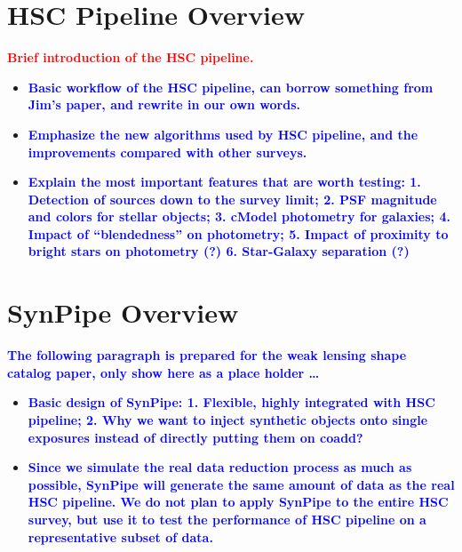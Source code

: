 \documentclass{pasj01}
\newcommand{\plan}[1]{\textcolor{blue} {\textbf{#1}}}
\newcommand{\todo}[1]{\textcolor{red} {\textbf{#1}}}
\begin{document}

\section{HSC Pipeline Overview}

    \todo{Brief introduction of the HSC pipeline.}
    \begin{itemize}
        \item \plan{Basic workflow of the HSC pipeline, 
                    can borrow something from Jim's paper, and rewrite in our own words.}
        \item \plan{Emphasize the new algorithms used by HSC pipeline, and the 
                    improvements compared with other surveys.}
        \item \plan{Explain the most important features that are worth testing:
                    1. Detection of sources down to the survey limit;
                    2. PSF magnitude and colors for stellar objects;
                    3. cModel photometry for galaxies;
                    4. Impact of ``blendedness'' on photometry;
                    5. Impact of proximity to bright stars on photometry (?)
                    6. Star-Galaxy separation (?)}   
    \end{itemize}


\section{SynPipe Overview}

    \plan{The following paragraph is prepared for the weak lensing shape catalog paper, 
          only show here as a place holder \ldots}
          
    \begin{itemize}
        \item \plan{Basic design of SynPipe:
                    1. Flexible, highly integrated with HSC pipeline;
                    2. Why we want to inject synthetic objects onto single 
                       exposures instead of directly putting them on coadd?}
        \item \plan{Since we simulate the real data reduction process as much 
                    as possible, SynPipe will generate the same amount of data
                    as the real HSC pipeline.  We do not plan to apply SynPipe
                    to the entire HSC survey, but use it to test the performance 
                    of HSC pipeline on a representative subset of data.}         
    \end{itemize}
    
\end{document}
